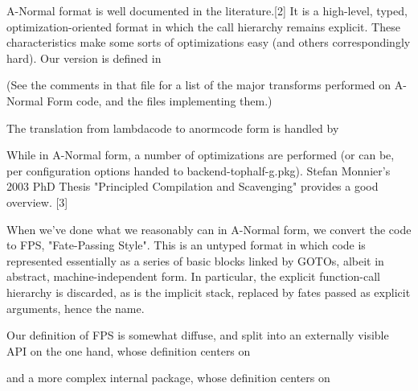 A-Normal format is well documented in the literature.[2]  It is a 
high-level, typed, optimization-oriented format in which the call 
hierarchy remains explicit.  These characteristics make some sorts 
of optimizations easy (and others correspondingly hard).  Our version 
is defined in

\begin{quote}
\end{quote}

(See the comments in that file for a list of the major transforms 
performed on A-Normal Form code, and the files implementing them.)

The translation from lambdacode to anormcode form is handled by

\begin{quote}
\end{quote}

While in A-Normal form, a number of optimizations are performed 
(or can be, per configuration options handed to backend-tophalf-g.pkg).
Stefan Monnier's 2003 PhD Thesis "Principled Compilation and Scavenging" 
provides a good overview. [3]

When we've done what we reasonably can in A-Normal form, we convert 
the code to FPS, "Fate-Passing Style".  This is an untyped 
format in which code is represented essentially as a series of basic 
blocks linked by GOTOs, albeit in abstract, machine-independent form. 
In particular, the explicit function-call hierarchy is discarded, as 
is the implicit stack, replaced by fates passed as explicit 
arguments, hence the name.

Our definition of FPS is somewhat diffuse, and split into an 
externally visible API on the one hand, whose definition 
centers on

\begin{quote}
    \newline
\end{quote}

and a more complex internal package, whose definition 
centers on

